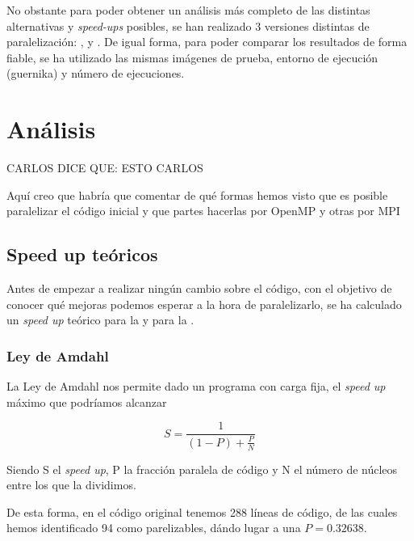 \documentclass[12pt]{report} %
\begin{document}
No obstante para poder obtener un análisis más completo de las distintas alternativas y \textit{speed-ups} posibles, se han realizado 3 versiones distintas de paralelización: ,  y . De igual forma, para poder comparar los resultados de forma fiable, se ha utilizado las mismas imágenes de prueba, entorno de ejecución (guernika) y número de ejecuciones.

\section{Análisis}

CARLOS DICE QUE: ESTO CARLOS

Aquí creo que habría que comentar de qué formas hemos visto que es posible paralelizar el código inicial y que partes hacerlas por OpenMP y otras por MPI

\subsection{Speed up teóricos}

Antes de empezar a realizar ningún cambio sobre el código, con el objetivo de conocer qué mejoras podemos esperar a la hora de paralelizarlo, se ha calculado un \textit{speed up} teórico para la  y para la .

\subsubsection{Ley de Amdahl}
\label{sec:Amdahl}

La Ley de Amdahl nos permite dado un programa con carga fija, el \textit{speed up} máximo que podríamos alcanzar

\[ S = \frac{1}{(1 - P) + \frac{P}{N}} \]

Siendo S el \textit{speed up}, P la fracción paralela de código y N el número de núcleos entre los que la dividimos.

De esta forma, en el código original tenemos 288 líneas de código, de las cuales hemos identificado 94 como parelizables, dándo lugar a una $P = 0.32638$.
\end{document}
